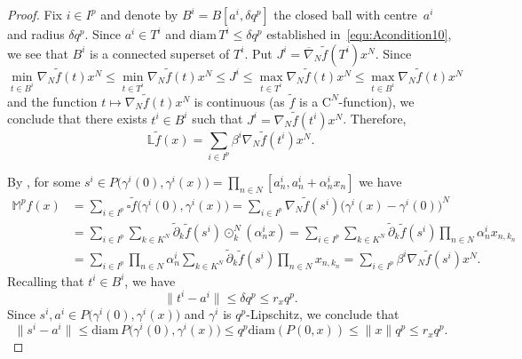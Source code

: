 \documentclass{amsart}
\theoremstyle{plain}%
\theoremstyle{definition}
\theoremstyle{remark}
\begin{document}
\begin{proof}
Fix $i\in I^p$ and denote by $B^i=B[a^i,\delta q^p]$ the closed ball with centre~$a^i$ and radius $\delta q^p$. Since $a^i\in T^i$ and ${\text{diam}\,T^i\le\delta q^p}$ established in~\eqref{equ:Acondition10}, we see that $B^i$ is a connected superset of $T^i$. Put $J^i=\overline{\nabla}\!_N\widetilde{f}(T^i)x^N$.
Since 
\begin{equation*}
\min_{t\in B^i}\nabla\!_N\widetilde{f}(t) x^N\le \min_{t\in T^i}\nabla\!_N\widetilde{f}(t) x^N \le J^i\le \max_{t\in T^i}\nabla\!_N\widetilde{f}(t) x^N
\le \max_{t\in B^i}\nabla\!_N\widetilde{f}(t) x^N
\end{equation*} 
and the function $t\mapsto\nabla\!_N\widetilde{f}(t)x^N$ is continuous (as $\widetilde{f}$ is a $\mathrm{C}^N$\nobreakdash-function), we conclude that there exists $t^i\in B^i$ such that $J^i=\nabla\!_N\widetilde{f}(t^i)x^N$. Therefore,
\begin{equation}\label{equ:Acondition12}
\mathbb{L}\widetilde{f}(x)=\sum_{i\in I^p}\beta^i \nabla\!_N\widetilde{f}(t^i)x^N.
\end{equation} 
	
By , for some $s^i\in P\big(\gamma^i(0),\gamma^i(x)\big)=\prod_{n\in N}[a^i_n,a^i_n+\alpha^i_nx_n]$ we have
\begin{equation}\label{equ:Acondition13}
\begin{split}
\mathbb{M}^pf(x)&=\sum_{i\in I^p}\square \widetilde{f}\big(\gamma^i(0),\gamma^i(x)\big)
=\sum_{i\in I^p} \nabla\!_N\widetilde{f}(s^i) \big(\gamma^i(x)-\gamma^i(0)\big)^N\\
&= \sum_{i\in I^p}\sum_{k\in K^N}\widetilde{\partial}_k\widetilde{f}(s^i)\odot^N_k(\alpha^i_nx)
=\sum_{i\in I^p}\sum_{k\in K^N}\widetilde{\partial}_k\widetilde{f}(s^i)\prod_{n\in N}\alpha^i_nx_{n,k_n}\\
&=\sum_{i\in I^p}\prod_{n\in N}\alpha^i_n\sum_{k\in K^N}\widetilde{\partial}_k\widetilde{f}(s^i)\prod_{n\in N}x_{n,k_n}
= \sum_{i\in I^p} \beta^i\nabla\!_N\widetilde{f}(s^i) x^N.
\end{split}
\end{equation}
Recalling that $t^i\in B^i$, we have
\begin{equation*}
\|t^i-a^i\|\le \delta q^p\le r_xq^p.
\end{equation*}
Since $s^i,a^i\in P\big(\gamma^i(0),\gamma^i(x)\big)$ and $\gamma^i$ is $q^p$\nobreakdash-Lipschitz, we conclude that  
\begin{equation*}
\|s^i-a^i\|\le\mathrm{diam}\,P\big(\gamma^i(0),\gamma^i(x)\big)
\leq q^p\mathrm{diam} (P(0,x))\le \|x\| q^p\le r_xq^p.
\end{equation*}	


\end{proof}
\end{document}
